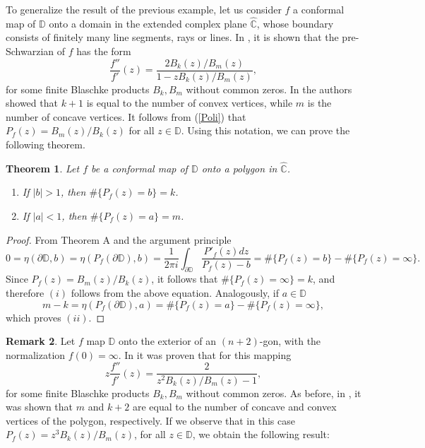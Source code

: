 \documentclass[reqno]{amsart}
\theoremstyle{plain}
\newtheorem{theo}{Theorem}[section]
\theoremstyle{definition}
\newtheorem{rem}[theo]{Remark}
\newcommand{\C}{\mathbb{C}}
\newcommand{\D}{\mathbb{D}}
\begin{document}
To generalize the result of the previous example, let us consider $f$ a conformal map of $\D$ onto a domain in the extended complex plane $\hat{\C}$, whose boundary consists of finitely many line segments, rays or lines. In \cite{Chuaqui2012}, it is shown that the pre-Schwarzian of $f$ has the form 
\begin{equation}\label{Poli}
   \frac{f''}{f'}(z)=\frac{2B_k(z)/B_m(z)}{1-zB_k(z)/B_m(z)}, 
\end{equation}
for some finite Blaschke products $B_k, B_m$ without common zeros. In \cite{Chuaqui2014} the authors showed that $k+1$ is equal to the number of convex
vertices, while $m$ is the number of concave vertices. It follows from (\ref{Poli}) that $P_f(z)=B_m(z)/B_k(z)$ for all $z\in \D$. Using this notation, we can prove the following theorem.

\begin{theo}
 Let $f$ be a conformal map of $\D$ onto a polygon in $\hat{\C}$.
 \begin{enumerate}[wide]
     \item [$(i)$] If $|b|>1$, then $\#\{P_f(z)=b\}=k$.
     \item [$(ii)$] If $|a|<1$, then $\#\{P_f(z)=a\}=m$.
 \end{enumerate}
 \end{theo}
 
\begin{proof}
   From Theorem A and the argument principle 
\begin{equation*}
    0 =\eta(\partial \D,b)=\eta(P_f(\partial \D),b) = \frac{1}{2\pi i}\int_{\partial \D} \frac{P'_f(z)dz}{P_f(z)-b}= \#\{P_f(z)=b\}-\#\{P_f(z)=\infty\}. 
\end{equation*}
Since $P_f(z)=B_m(z)/B_k(z)$, it follows that $\#\{P_f(z)=\infty\}=k$, and therefore $(i)$ follows from the above equation. Analogously, if $a\in \D$ 
\begin{equation*}
    m-k =\eta(P_f(\partial \D),a) = \#\{P_f(z)=a\}-\#\{P_f(z)=\infty\},
\end{equation*}
which proves $(ii)$.
\end{proof} 

\begin{rem}
Let $f$ map $\D $ onto the exterior of an $(n+2)$-gon, with the normalization $f(0) =\infty$. In \cite{Chuaqui2012} it was proven that for this mapping
\begin{equation*}
    z\frac{f''}{f'}(z)=\frac{2}{z^2B_k(z)/B_m(z)-1},
\end{equation*}
for some finite Blaschke products $B_k, B_m$ without common zeros. As before, in \cite{Chuaqui2014}, it was shown that $m$ and $k+2$ are equal to the number of concave and convex vertices of the polygon, respectively. If we observe that in this case $P_f(z)=z^3B_k(z)/B_m(z)$, for all $z\in \D$, we obtain the following result:
\end{rem}
\end{document}
